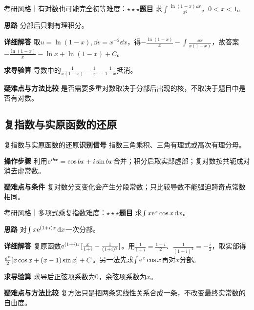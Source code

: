 \begin{example}{考研风格｜有对数也可能完全初等}{难度：$\star\star\star$}\label{ic:ex:indefinite_special_complete:logelementary}\textbf{题目} 求$\int\frac{\ln(1-x)\dd x}{x^2}$，$0<x<1$。\par \textbf{思路} 分部后只剩有理积分。\par \textbf{详细解答} 取$u=\ln(1-x),\dd v=x^{-2}\dd x$，得$-\frac{\ln(1-x)}{x}-\int\frac{\dd x}{x(1-x)}$，故答案$-\frac{\ln(1-x)}{x}-\ln x+\ln(1-x)+C$。\par \textbf{求导验算} 导数中的$\frac{1}{x(1-x)}-\frac{1}{x}-\frac{1}{1-x}$抵消。\par \textbf{疑难点与方法比较} 是否需要多重对数取决于分部后出现的核，不取决于题目中是否有对数。\end{example}

\subsection{复指数与实原函数的还原}\label{ic:indefinite_special_complete:complex}\begin{method}{复指数与实原函数的还原}\textbf{识别信号} 指数三角乘积、三角有理式或高次有理分母。\par \textbf{操作步骤} 利用$\mathrm{e}^{ibx}=\cos bx+i\sin bx$合并；积分后取实部虚部；复对数按共轭成对消去虚常数。\par \textbf{疑难点与条件} 复对数分支变化会产生分段常数；只比较导数不能强迫跨奇点常数相同。\end{method}

\begin{example}{考研风格｜多项式乘复指数}{难度：$\star\star\star$}\label{ic:ex:indefinite_special_complete:complexpolynomial}\textbf{题目} 求$\int x\mathrm{e}^x\cos x\mathop{}\!\mathrm{d} x$。\par \textbf{思路} 对$\int x\mathrm{e}^{(1+i)x}\mathop{}\!\mathrm{d} x$一次分部。\par \textbf{详细解答} 复原函数$\mathrm{e}^{(1+i)x}[\frac{x}{1+i}-\frac{1}{(1+i)^2}]$。用$\frac{1}{1+i}=\frac{1-i}{2}$、$\frac{1}{(1+i)^2}=-\frac{i}{2}$，取实部得$\frac{\mathrm{e}^x}{2}[x\cos x+(x-1)\sin x]+C$。另一法先求$\int\mathrm{e}^x\cos x$再对$x$分部。\par \textbf{求导验算} 求导后正弦项系数为0，余弦项系数为$x$。\par \textbf{疑难点与方法比较} 复方法只是把两条实线性关系合成一条，不改变最终实常数的自由度。\end{example}


